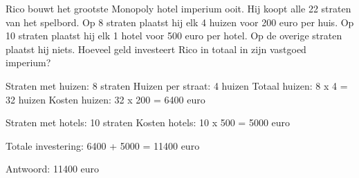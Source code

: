 \begin{opgave}
Rico bouwt het grootste Monopoly hotel imperium ooit. Hij koopt alle 22 
straten van het spelbord. Op 8 straten plaatst hij elk 4 huizen voor 200 euro 
per huis. Op 10 straten plaatst hij elk 1 hotel voor 500 euro per hotel. Op de 
overige straten plaatst hij niets. Hoeveel geld investeert Rico in totaal in 
zijn vastgoed imperium?
\end{opgave}

\begin{oplossing}
Straten met huizen: 8 straten
Huizen per straat: 4 huizen
Totaal huizen: 8 x 4 = 32 huizen
Kosten huizen: 32 x 200 = 6400 euro

Straten met hotels: 10 straten  
Kosten hotels: 10 x 500 = 5000 euro

Totale investering:
6400 + 5000 = 11400 euro

Antwoord: 11400 euro
\end{oplossing}